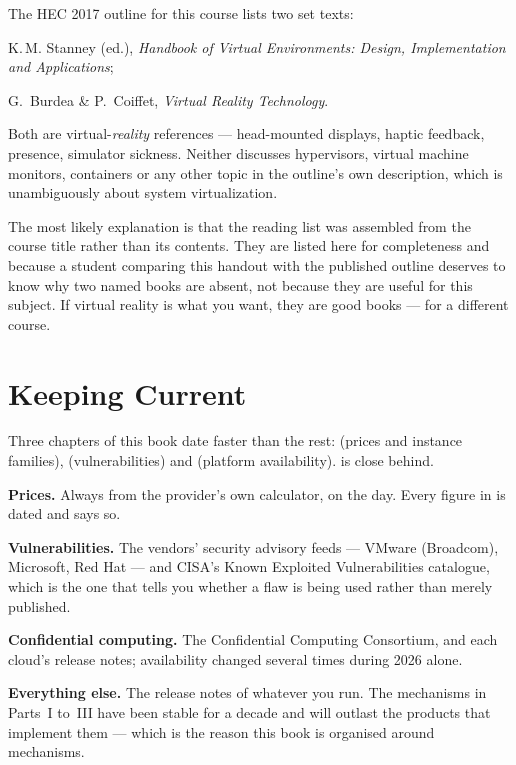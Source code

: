 \begin{alertbox}
The HEC 2017 outline for this course lists two set texts:

\begin{tight}
  \item K.\,M. Stanney (ed.), \emph{Handbook of Virtual Environments: Design,
        Implementation and Applications};
  \item G.\ Burdea \& P.\ Coiffet, \emph{Virtual Reality Technology}.
\end{tight}

Both are virtual-\emph{reality} references --- head-mounted displays, haptic
feedback, presence, simulator sickness. Neither discusses hypervisors,
virtual machine monitors, containers or any other topic in the outline's own
description, which is unambiguously about system virtualization.

\smallskip
The most likely explanation is that the reading list was assembled from the
course title rather than its contents. They are listed here for completeness
and because a student comparing this handout with the published outline
deserves to know why two named books are absent, not because they are useful
for this subject. If virtual reality is what you want, they are good books ---
for a different course.
\end{alertbox}

\section{Keeping Current}

Three chapters of this book date faster than the rest:  (prices
and instance families),  (vulnerabilities) and
 (platform availability).  is close behind.

\begin{tight}
  \item \textbf{Prices.} Always from the provider's own calculator, on the day.
        Every figure in  is dated and says so.
  \item \textbf{Vulnerabilities.} The vendors' security advisory feeds --- VMware
        (Broadcom), Microsoft, Red Hat --- and CISA's Known Exploited
        Vulnerabilities catalogue, which is the one that tells you whether a
        flaw is being used rather than merely published.
  \item \textbf{Confidential computing.} The Confidential Computing Consortium,
        and each cloud's release notes; availability changed several times
        during 2026 alone.
  \item \textbf{Everything else.} The release notes of whatever you run. The
        mechanisms in Parts~I to~III have been stable for a decade and will
        outlast the products that implement them --- which is the reason this
        book is organised around mechanisms.
\end{tight}
